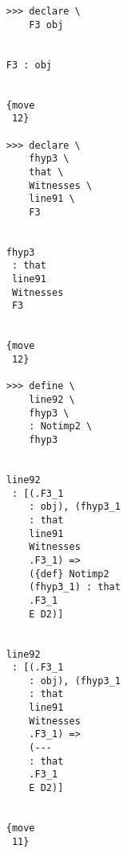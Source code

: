 \documentclass[12pt]{article}
\begin{document}
\begin{verbatim}
                                    >>> declare \
                                        F3 obj


                                    F3 : obj


                                    {move 
                                     12}

                                    >>> declare \
                                        fhyp3 \
                                        that \
                                        Witnesses \
                                        line91 \
                                        F3


                                    fhyp3 
                                     : that 
                                     line91 
                                     Witnesses 
                                     F3


                                    {move 
                                     12}

                                    >>> define \
                                        line92 \
                                        fhyp3 \
                                        : Notimp2 \
                                        fhyp3


                                    line92 
                                     : [(.F3_1 
                                        : obj), (fhyp3_1 
                                        : that 
                                        line91 
                                        Witnesses 
                                        .F3_1) => 
                                        ({def} Notimp2 
                                        (fhyp3_1) : that 
                                        .F3_1 
                                        E D2)]


                                    line92 
                                     : [(.F3_1 
                                        : obj), (fhyp3_1 
                                        : that 
                                        line91 
                                        Witnesses 
                                        .F3_1) => 
                                        (--- 
                                        : that 
                                        .F3_1 
                                        E D2)]


                                    {move 
                                     11}


\end{verbatim}
\end{document}
